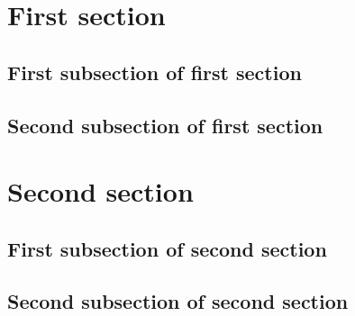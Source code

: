 \documentclass[utf-8]{article}
\begin{document}
	\tableofcontents
	\newpage
	\section{First section}
	\subsection{First subsection of first section}
	\newpage
	\subsection{Second subsection of first section}
	\newpage
	\section{Second section}
	\subsection{First subsection of second section}
	\newpage
	\subsection{Second subsection of second section}
\end{document}
